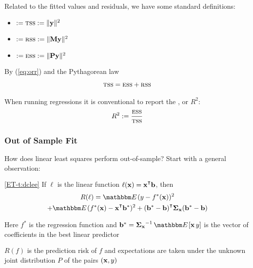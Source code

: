 \begin{frame}
    
    \vspace{2em}
    Related to the fitted values and residuals, we have some standard definitions:
    \begin{itemize}
        \item {} $:= \textrm{{\sc tss}} := \| {\mathbf y} \|^2$
        \item {} $ := \textrm{{\sc rss}} := \| \mathbf M {\mathbf y} \|^2$
        \item {} $ := \textrm{{\sc ess}} := \| \mathbf P {\mathbf y} \|^2$
    \end{itemize}
    By (\ref{eq:orr}) and the Pythagorean law
    \begin{equation}
        \label{eq:bdtss}
        \textrm{{\sc tss}} = \textrm{{\sc ess}} + \textrm{{\sc rss}}
    \end{equation}
    
    \vspace{.7em}
    When running regressions it is conventional to report the , or $R^2$:
    \begin{equation}
        \label{eq:rsd}
        R^2 := \frac{\textrm{{\sc ess}}}{\textrm{{\sc tss}}}
    \end{equation}
\end{frame}


\begin{frame}\frametitle{Out of Sample Fit}
    
    \vspace{2em}
    How does linear least squares perform out-of-sample? Start with
    a general
    observation:

    \Thm
        \eqref{ET-t:dclee}
        If $\ell$ is the linear function $\ell (\boldx) =
        \boldx^\T \boldb$, then
        \begin{multline*}
            R(\ell)
            = \EE (y - f^*(\boldx))^2  
           \\ + \EE (f^*(\boldx) - \boldx^\T \boldb^*)^2 
            +  (\boldb^* - \boldb)^\T 
                \Sigmax (\boldb^* - \boldb) 
        \end{multline*}
    
    Here $f^*$ is the regression function and $\boldb^* = \Sigmax^{-1} \,
    \EE[\boldx \, y]$ is the vector of coefficients in the best linear predictor
    
    $R(f)$ is the prediction risk
    of $f$ and expectations are taken under the unknown joint distribution $P$ of
    the pairs $({\mathbf x}, y)$

\end{frame}

